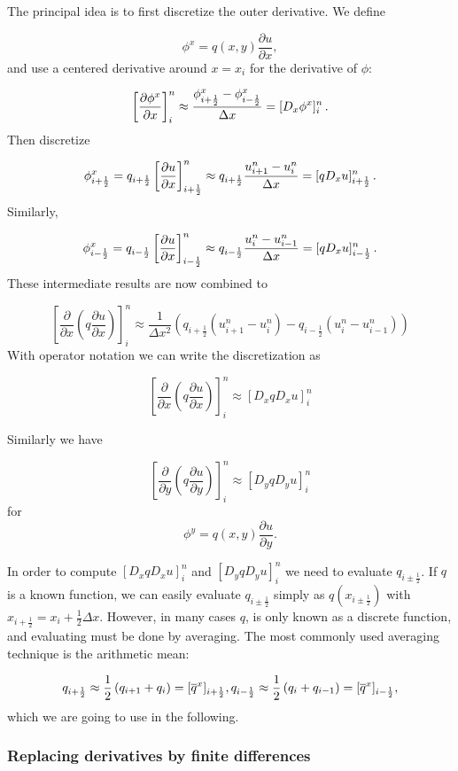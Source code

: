 \documentclass[letterpaper,10pt,english]{/usr/share/sphinx/texinputs/sphinxhowto}
\begin{document}
The principal idea is to first discretize the outer derivative. We
define

\[
\phi^x = q(x,y)
\frac{\partial u}{\partial x},
\] and use a centered derivative around $x=x_i$ for the derivative of
$\phi$:

\[
\left[\frac{\partial\phi^x}{\partial x}\right]^n_i
\approx \frac{\phi^x_{i+\frac{1}{2}} - \phi^x_{i-\frac{1}{2}}}{\Delta x}
= [D_x\phi^x]^n_i
\thinspace .
\] Then discretize

\[
\phi^x_{i+\frac{1}{2}}  = q_{i+\frac{1}{2}}
\left[\frac{\partial u}{\partial x}\right]^n_{i+\frac{1}{2}}
\approx q_{i+\frac{1}{2}} \frac{u^n_{i+1} - u^n_{i}}{\Delta x}
= [q D_x u]_{i+\frac{1}{2}}^n
\thinspace .
\] Similarly,

\[
\phi^x_{i-\frac{1}{2}}  = q_{i-\frac{1}{2}}
\left[\frac{\partial u}{\partial x}\right]^n_{i-\frac{1}{2}}
\approx q_{i-\frac{1}{2}} \frac{u^n_{i} - u^n_{i-1}}{\Delta x}
= [q D_x u]_{i-\frac{1}{2}}^n
\thinspace .
\] These intermediate results are now combined to

\[
\left[
     \frac{\partial}{\partial x}\left( q
     \frac{\partial u}{\partial x}\right)\right]^n_i
     \approx \frac{1}{\Delta x^2}
     \left( q_{i+\frac{1}{2}} \left({u^n_{i+1} - u^n_{i}}\right)
     - q_{i-\frac{1}{2}} \left({u^n_{i} - u^n_{i-1}}\right)\right)
\] With operator notation we can write the discretization as

\[
\left[
     \frac{\partial}{\partial x}\left( q
     \frac{\partial u}{\partial x}\right)\right]^n_i
     \approx [D_xq D_x u]^n_i
\]

Similarly we have

\[
\left[
     \frac{\partial}{\partial y}\left( q
     \frac{\partial u}{\partial y}\right)\right]^n_i
     \approx [D_yq D_y u]^n_i
\] for \[
\phi^y = q(x,y)
\frac{\partial u}{\partial y}.
\]

In order to compute $[D_xq D_x u]^n_i$ and $[D_yq D_y u]^n_i$ we need to
evaluate $q_{i\pm\frac{1}{2}}$. If $q$ is a known function, we can
easily evaluate $q_{i\pm\frac{1}{2}}$ simply as $q(x_{i\pm\frac{1}{2}})$
with $x_{i+\frac{1}{2}} = x_i + \frac{1}{2}\Delta x$. However, in many
cases $q$, is only known as a discrete function, and evaluating must be
done by averaging. The most commonly used averaging technique is the
arithmetic mean:

\[
q_{i+\frac{1}{2}} \approx
     \frac{1}{2}\left(q_{i+1}+ q_{i}\right) =
     [\overline{q}^{x}]_{i+\frac{1}{2}},\\
q_{i-\frac{1}{2}} \approx
     \frac{1}{2}\left(q_{i}+ q_{i-1}\right) =
     [\overline{q}^{x}]_{i-\frac{1}{2}},  
\] which we are going to use in the following.\subsubsection{Replacing derivatives by finite differences}
\end{document}

